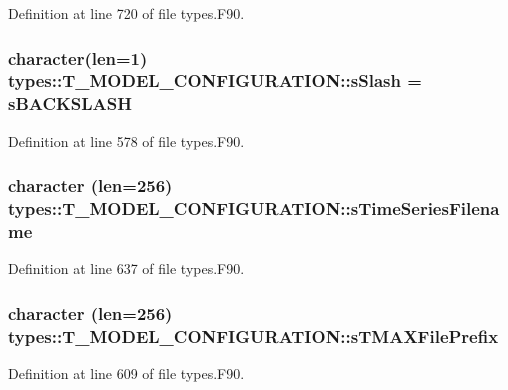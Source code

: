 Definition at line 720 of file types.F90.

\hypertarget{typetypes_1_1_t___m_o_d_e_l___c_o_n_f_i_g_u_r_a_t_i_o_n_a5509f4ea7a22c6cf4f3058b9b8947531}{
\subsubsection[{sSlash}]{\setlength{\rightskip}{0pt plus 5cm}character(len=1) {\bf types::T\_\-MODEL\_\-CONFIGURATION::sSlash} = {\bf sBACKSLASH}}}
\label{typetypes_1_1_t___m_o_d_e_l___c_o_n_f_i_g_u_r_a_t_i_o_n_a5509f4ea7a22c6cf4f3058b9b8947531}


Definition at line 578 of file types.F90.

\hypertarget{typetypes_1_1_t___m_o_d_e_l___c_o_n_f_i_g_u_r_a_t_i_o_n_a84d027a4ad104b1fbecc5a051a596830}{
\subsubsection[{sTimeSeriesFilename}]{\setlength{\rightskip}{0pt plus 5cm}character (len=256) {\bf types::T\_\-MODEL\_\-CONFIGURATION::sTimeSeriesFilename}}}
\label{typetypes_1_1_t___m_o_d_e_l___c_o_n_f_i_g_u_r_a_t_i_o_n_a84d027a4ad104b1fbecc5a051a596830}


Definition at line 637 of file types.F90.

\hypertarget{typetypes_1_1_t___m_o_d_e_l___c_o_n_f_i_g_u_r_a_t_i_o_n_a2450e192f40628020ef436689696d447}{
\subsubsection[{sTMAXFilePrefix}]{\setlength{\rightskip}{0pt plus 5cm}character (len=256) {\bf types::T\_\-MODEL\_\-CONFIGURATION::sTMAXFilePrefix}}}
\label{typetypes_1_1_t___m_o_d_e_l___c_o_n_f_i_g_u_r_a_t_i_o_n_a2450e192f40628020ef436689696d447}


Definition at line 609 of file types.F90.

